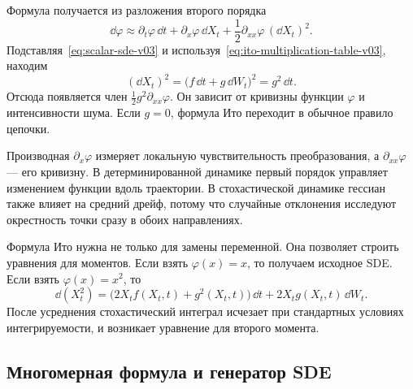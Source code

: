Формула получается из разложения второго порядка
\[
\dd\varphi
\approx
\partial_t\varphi\,\dd t
+
\partial_x\varphi\,\dd X_t
+
\frac12\partial_{xx}\varphi\,(\dd X_t)^2.
\]
Подставляя~\eqref{eq:scalar-sde-v03} и используя~\eqref{eq:ito-multiplication-table-v03}, находим
\[
(\dd X_t)^2
=
\bigl(f\,\dd t+g\,\dd W_t\bigr)^2
=
g^2\,\dd t.
\]
Отсюда появляется член $\tfrac12g^2\partial_{xx}\varphi$. Он зависит от кривизны функции $\varphi$ и интенсивности шума. Если $g=0$, формула Ито переходит в обычное правило цепочки.

\begin{connection}
Производная $\partial_x\varphi$ измеряет локальную чувствительность преобразования, а $\partial_{xx}\varphi$ --- его кривизну. В детерминированной динамике первый порядок управляет изменением функции вдоль траектории. В стохастической динамике гессиан также влияет на средний дрейф, потому что случайные отклонения исследуют окрестность точки сразу в обоих направлениях.
\end{connection}

Формула Ито нужна не только для замены переменной. Она позволяет строить уравнения для моментов. Если взять $\varphi(x)=x$, то получаем исходное SDE. Если взять $\varphi(x)=x^2$, то
\begin{equation}
\label{eq:ito-square-general-v03}
\dd(X_t^2)
=
\bigl(2X_tf(X_t,t)+g^2(X_t,t)\bigr)\,\dd t
+
2X_tg(X_t,t)\,\dd W_t.
\end{equation}
После усреднения стохастический интеграл исчезает при стандартных условиях интегрируемости, и возникает уравнение для второго момента.

\subsection{Многомерная формула и генератор SDE}

